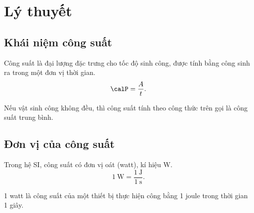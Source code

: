 \setcounter{section}{0}
\section{Lý thuyết}
\subsection{Khái niệm công suất}
Công suất là đại lượng đặc trưng cho tốc độ sinh công, được tính bằng công sinh ra trong một đơn vị thời gian.
\begin{equation*}
	\calP=\dfrac{A}{t}.
\end{equation*}

Nếu vật sinh công không đều, thì công suất tính theo công thức trên gọi là công suất trung bình. 
\subsection{Đơn vị của công suất}

Trong hệ SI, công suất có đơn vị oát (watt), kí hiệu W.
\begin{equation*}
	1\ \text{W}=\dfrac{1\ \text{J}}{1\ \text{s}}.
\end{equation*}

1 watt là công suất của một thiết bị thực hiện công bằng 1 joule  trong thời gian 1 giây.

